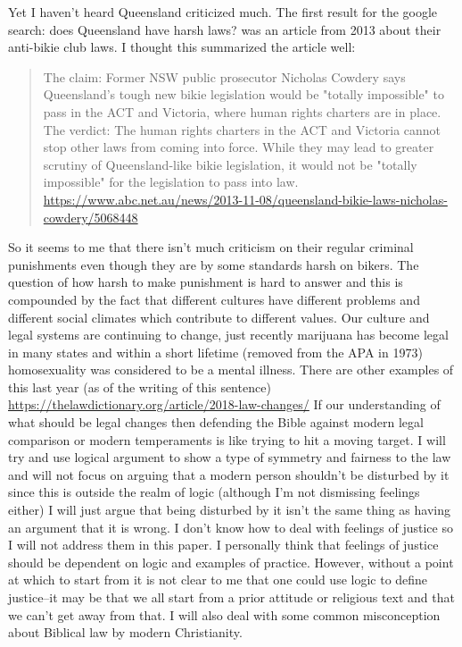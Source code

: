 \documentclass[11pt]{article}
\begin{document}
Yet I haven't heard Queensland criticized much. The first result for the google search: does Queensland have harsh laws? was an article from 2013 about their anti-bikie club laws. I thought this summarized the article well:
\begin{quote}
The claim: Former NSW public prosecutor Nicholas Cowdery says Queensland's tough new bikie legislation would be "totally impossible" to pass in the ACT and Victoria, where human rights charters are in place.
The verdict: The human rights charters in the ACT and Victoria cannot stop other laws from coming into force. While they may lead to greater scrutiny of Queensland-like bikie legislation, it would not be "totally impossible" for the legislation to pass into law. \url{https://www.abc.net.au/news/2013-11-08/queensland-bikie-laws-nicholas-cowdery/5068448}
\end{quote}

So it seems to me that there isn't much criticism on their regular criminal punishments even though they are by some standards harsh on bikers. The question of how harsh to make punishment is hard to answer and this is compounded by the fact that different cultures have different problems and different social climates which contribute to different values. Our culture and legal systems are continuing to change, just recently marijuana has become legal in many states and within a short lifetime (removed from the APA in 1973) homosexuality was considered to be a mental illness. There are other examples of this last year (as of the writing of this sentence) \url{https://thelawdictionary.org/article/2018-law-changes/} If our understanding of what should be legal changes then defending the Bible against modern legal comparison or modern temperaments is like trying to hit a moving target. I will try and use logical argument to show a type of symmetry and fairness to the law and will not focus on arguing that a modern person shouldn't be disturbed by it since this is outside the realm of logic (although I'm not dismissing feelings either) I will just argue that being disturbed by it isn't the same thing as having an argument that it is wrong. I don't know how to deal with feelings of justice so I will not address them in this paper. I personally think that feelings of justice should be dependent on logic and examples of practice. However, without a point at which to start from it is not clear to me that one could use logic to define justice--it may be that we all start from a prior attitude or religious text and that we can't get away from that. I will also deal with some common misconception about Biblical law by modern Christianity. 
\end{document}
